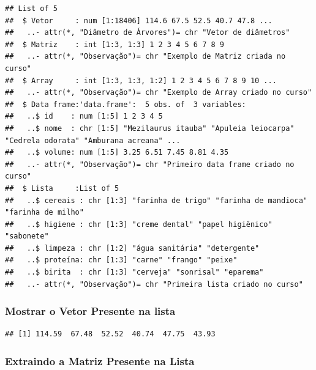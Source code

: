 \documentclass[
]{article}
\newenvironment{Shaded}{\begin{snugshade}}{\end{snugshade}}
\newcommand{\FunctionTok}[1]{\textcolor[rgb]{0.00,0.00,0.00}{#1}}
\newcommand{\NormalTok}[1]{#1}
\newcommand{\SpecialCharTok}[1]{\textcolor[rgb]{0.00,0.00,0.00}{#1}}
\begin{document}
\begin{verbatim}
## List of 5
##  $ Vetor     : num [1:18406] 114.6 67.5 52.5 40.7 47.8 ...
##   ..- attr(*, "Diâmetro de Árvores")= chr "Vetor de diâmetros"
##  $ Matriz    : int [1:3, 1:3] 1 2 3 4 5 6 7 8 9
##   ..- attr(*, "Observação")= chr "Exemplo de Matriz criada no curso"
##  $ Array     : int [1:3, 1:3, 1:2] 1 2 3 4 5 6 7 8 9 10 ...
##   ..- attr(*, "Observação")= chr "Exemplo de Array criado no curso"
##  $ Data frame:'data.frame':  5 obs. of  3 variables:
##   ..$ id    : num [1:5] 1 2 3 4 5
##   ..$ nome  : chr [1:5] "Mezilaurus itauba" "Apuleia leiocarpa" "Cedrela odorata" "Amburana acreana" ...
##   ..$ volume: num [1:5] 3.25 6.51 7.45 8.81 4.35
##   ..- attr(*, "Observação")= chr "Primeiro data frame criado no curso"
##  $ Lista     :List of 5
##   ..$ cereais : chr [1:3] "farinha de trigo" "farinha de mandioca" "farinha de milho"
##   ..$ higiene : chr [1:3] "creme dental" "papel higiênico" "sabonete"
##   ..$ limpeza : chr [1:2] "água sanitária" "detergente"
##   ..$ proteína: chr [1:3] "carne" "frango" "peixe"
##   ..$ birita  : chr [1:3] "cerveja" "sonrisal" "eparema"
##   ..- attr(*, "Observação")= chr "Primeira lista criado no curso"
\end{verbatim}

\hypertarget{mostrar-o-vetor-presente-na-lista}{%
\subsubsection{Mostrar o Vetor Presente na
lista}\label{mostrar-o-vetor-presente-na-lista}}

\begin{Shaded}
\end{Shaded}

\begin{verbatim}
## [1] 114.59  67.48  52.52  40.74  47.75  43.93
\end{verbatim}

\hypertarget{extraindo-a-matriz-presente-na-lista}{%
\subsubsection{Extraindo a Matriz Presente na
Lista}\label{extraindo-a-matriz-presente-na-lista}}

\begin{Shaded}
\end{Shaded}
\end{document}
